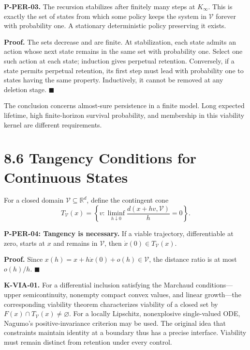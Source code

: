 \documentclass[
  english,
  11pt,
  oneside]{book}
\newcounter{none} %
\begin{document}
\hypertarget{p-per-03}{}\label{p-per-03}

\textbf{P-PER-03.} The recursion stabilizes after finitely many steps at \(K_\infty\). This is exactly the set of states from which some policy keeps the system in \(\mathcal V\) forever with probability one. A stationary deterministic policy preserving it exists.

\textbf{Proof.} The sets decrease and are finite. At stabilization, each state admits an action whose next state remains in the same set with probability one. Select one such action at each state; induction gives perpetual retention. Conversely, if a state permits perpetual retention, its first step must lead with probability one to states having the same property. Inductively, it cannot be removed at any deletion stage. \(\blacksquare\)

The conclusion concerns almost-sure persistence in a finite model. Long expected lifetime, high finite-horizon survival probability, and membership in this viability kernel are different requirements.

\section{8.6 Tangency Conditions for Continuous States}\label{tangency-conditions-for-continuous-states}

For a closed domain \(\mathcal V\subseteq\mathbb R^d\), define the contingent cone \[T_{\mathcal V}(x)=
\left\{v:\liminf_{h\downarrow0}\frac{d(x+hv,\mathcal V)}h=0\right\}.\]

\hypertarget{p-per-04}{}\label{p-per-04}

\textbf{P-PER-04: Tangency is necessary.} If a viable trajectory, differentiable at zero, starts at \(x\) and remains in \(\mathcal V\), then \(\dot x(0)\in T_{\mathcal V}(x)\).

\textbf{Proof.} Since \(x(h)=x+h\dot x(0)+o(h)\in\mathcal V\), the distance ratio is at most \(o(h)/h\). \(\blacksquare\)

\textbf{K-VIA-01.} For a differential inclusion satisfying the Marchaud conditions---upper semicontinuity, nonempty compact convex values, and linear growth---the corresponding viability theorem characterizes viability of a closed set by \(F(x)\cap T_{\mathcal V}(x)\ne\varnothing\). For a locally Lipschitz, nonexplosive single-valued ODE, Nagumo's positive-invariance criterion may be used. The original idea that constraints maintain identity at a boundary thus has a precise interface. Viability must remain distinct from retention under every control.
\end{document}
